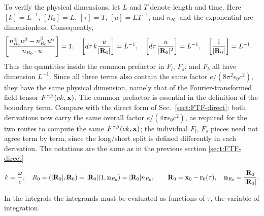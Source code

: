 To verify the physical dimensions, let $L$ and $T$ denote length and time.
Here $[k]=L^{-1}$, $[R_0]=L$, $[\tau]=T$, $[u]=L T^{-1}$,
and $n_{R_0}$ and the exponential are dimensionless.  Consequently,
\begin{align}
  \left[\frac{n_{R_0}^{\alpha}u^{\beta}-n_{R_0}^{\beta}u^{\alpha}}
  {n_{R_0}\cdot u}\right]&=1,\quad
  \left[d\tau\,k\frac{u}{|{\bf R}_0|}\right]=L^{-1}, \quad
  \left[d\tau\,\frac{u}{|{\bf R}_0|^2}\right]=L^{-1}, \quad
  \left[\frac1{|{\bf R}_0|}\right]=L^{-1}.
\end{align}
Thus the quantities inside the common prefactor in $F_l$, $F_s$, and $F_b$
all have dimension $L^{-1}$.  Since all three terms also contain the same
factor $e/(8\pi^2\epsilon_0c^2)$, they have the same physical dimension,
namely that of the Fourier-transformed field tensor $F^{\alpha\beta}(ck,{\bf
x})$.  The common prefactor is essential in the definition of the boundary
term.
Compare with the direct form of Sec.~\ref{sect:FTF-direct}: both derivations
now carry the same overall factor $e/(4\pi\epsilon_0c^2)$, as required for the
two routes to compute the same $F^{\alpha\beta}(ck,{\bf x})$; the individual
$F_l$, $F_s$ pieces need not agree term by term, since the long/short split is
defined differently in each derivation.
The notations are the same as in the previous section \ref{sect:FTF-direct}
\begin{highlightbox}
  \begin{align}
    k = \frac{\omega}{c},\quad
    R_0 = (|{\bf R}_0|,{\bf R}_0)=|{\bf R}_0| (1,{\bf n}_{R_0}) = |{\bf R}_0|n_{R_0}, \qquad {\bf R}_0 = {\bf x}_0-{\bf r}_0(\tau),\quad {\bf n}_{R_0} = \frac{{\bf R}_0}{|{\bf R}_0|}.
  \end{align}
\end{highlightbox}
In the integrals the integrands must be evaluated as functions of $\tau$, the variable of integration.
